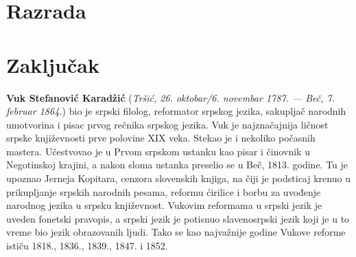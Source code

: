 \documentclass[12pt,oneside]{memoir}
\begin{document}


\chapter{Razrada}
\label{chp:razrada}




\chapter{Zaključak}


\literatura

\backmatter

\begin{biografija}
  \textbf{Vuk Stefanović Karadžić} (\emph{Tršić,
    26. oktobar/6. novembar 1787. — Beč, 7. februar 1864.}) bio je
  srpski filolog, reformator srpskog jezika, sakupljač narodnih
  umotvorina i pisac prvog rečnika srpskog jezika.  Vuk je
  najznačajnija ličnost srpske književnosti prve polovine XIX
  veka. Stekao je i nekoliko počasnih mastera.  Učestvovao je u
  Prvom srpskom ustanku kao pisar i činovnik u Negotinskoj krajini, a
  nakon sloma ustanka preselio se u Beč, 1813. godine. Tu je upoznao
  Jerneja Kopitara, cenzora slovenskih knjiga, na čiji je podsticaj
  krenuo u prikupljanje srpskih narodnih pesama, reformu ćirilice i
  borbu za uvođenje narodnog jezika u srpsku književnost. Vukovim
  reformama u srpski jezik je uveden fonetski pravopis, a srpski jezik
  je potisnuo slavenosrpski jezik koji je u to vreme bio jezik
  obrazovanih ljudi. Tako se kao najvažnije godine Vukove reforme
  ističu 1818., 1836., 1839., 1847. i 1852.
\end{biografija}
\end{document}
